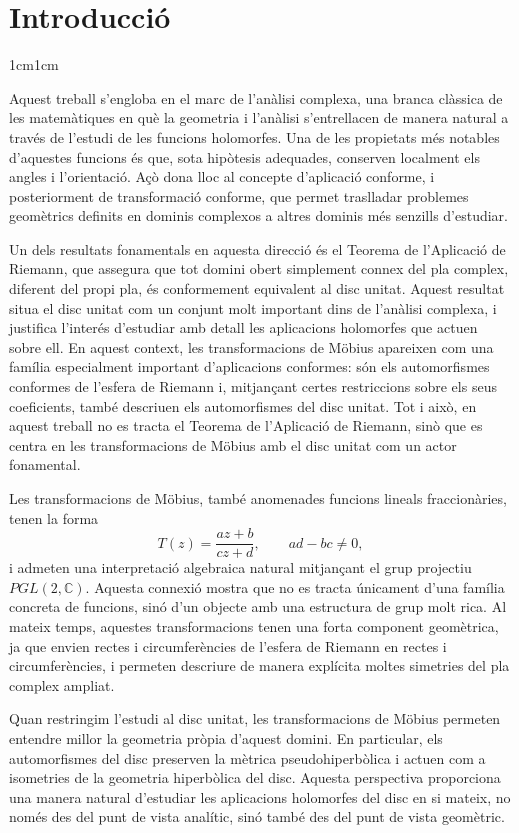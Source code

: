 \section{Introducció}

\begin{adjustwidth}{1cm}{1cm}

Aquest treball s'engloba en el marc de l'anàlisi complexa, una branca clàssica de les matemàtiques en què la geometria i l'anàlisi s'entrellacen de manera natural a través de l'estudi de les funcions holomorfes. Una de les propietats més notables d'aquestes funcions és que, sota hipòtesis adequades, conserven localment els angles i l'orientació. Açò dona lloc al concepte d'aplicació conforme, i posteriorment de transformació conforme, que permet traslladar problemes geomètrics definits en dominis complexos a altres dominis més senzills d'estudiar.

Un dels resultats fonamentals en aquesta direcció és el Teorema de l'Aplicació de Riemann, que assegura que tot domini obert simplement connex del pla complex, diferent del propi pla, és conformement equivalent al disc unitat. Aquest resultat situa el disc unitat com un conjunt molt important dins de l'anàlisi complexa, i justifica l'interés d'estudiar amb detall les aplicacions holomorfes que actuen sobre ell. En aquest context, les transformacions de Möbius apareixen com una família especialment important d'aplicacions conformes: són els automorfismes conformes de l'esfera de Riemann i, mitjançant certes restriccions sobre els seus coeficients, també descriuen els automorfismes del disc unitat. Tot i això, en aquest treball no es tracta el Teorema de l'Aplicació de Riemann, sinò que es centra en les transformacions de Möbius amb el disc unitat com un actor fonamental.

Les transformacions de Möbius, també anomenades funcions lineals fraccionàries, tenen la forma
\[
T(z)=\frac{az+b}{cz+d}, \qquad ad-bc\neq 0,
\]
i admeten una interpretació algebraica natural mitjançant el grup projectiu $PGL(2,\mathbb{C})$. Aquesta connexió mostra que no es tracta únicament d'una família concreta de funcions, sinó d'un objecte amb una estructura de grup molt rica. Al mateix temps, aquestes transformacions tenen una forta component geomètrica, ja que envien rectes i circumferències de l'esfera de Riemann en rectes i circumferències, i permeten descriure de manera explícita moltes simetries del pla complex ampliat.

Quan restringim l'estudi al disc unitat, les transformacions de Möbius permeten entendre millor la geometria pròpia d'aquest domini. En particular, els automorfismes del disc preserven la mètrica pseudohiperbòlica i actuen com a isometries de la geometria hiperbòlica del disc. Aquesta perspectiva proporciona una manera natural d'estudiar les aplicacions holomorfes del disc en si mateix, no només des del punt de vista analític, sinó també des del punt de vista geomètric.


\end{adjustwidth}
